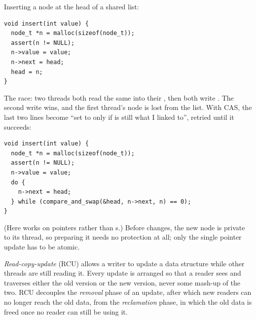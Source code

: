 \begin{example}
  Inserting a node at the head of a shared list:
\begin{lstlisting}
void insert(int value) {
  node_t *n = malloc(sizeof(node_t));
  assert(n != NULL);
  n->value = value;
  n->next = head;
  head = n;
}
\end{lstlisting}
  The race: two threads both read the same  into their , then both write . The second write wins, and the first thread's node is lost from the list. With CAS, the last two lines become ``set  to  only if  is still what I linked  to'', retried until it succeeds:
\begin{lstlisting}
void insert(int value) {
  node_t *n = malloc(sizeof(node_t));
  assert(n != NULL);
  n->value = value;
  do {
    n->next = head;
  } while (compare_and_swap(&head, n->next, n) == 0);
}
\end{lstlisting}
  (Here  works on pointers rather than s.) Before  changes, the new node is private to its thread, so preparing it needs no protection at all; only the single pointer update has to be atomic.
\end{example}

\begin{definition}
  \emph{Read-copy-update} (RCU) allows a writer to update a data structure while other threads are still reading it. Every update is arranged so that a reader sees and traverses either the old version or the new version, never some mash-up of the two. RCU decouples the \emph{removal} phase of an update, after which new readers can no longer reach the old data, from the \emph{reclamation} phase, in which the old data is freed once no reader can still be using it.
\end{definition}

